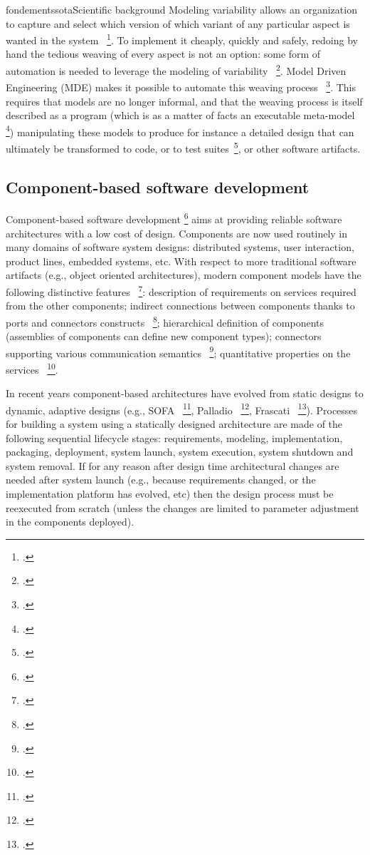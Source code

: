 \documentclass{ra2018}
\begin{document}
\begin{module}{fondements}{sota}{Scientific background}
Modeling variability allows an organization to capture and select which
version of which variant of any particular aspect is wanted in the
system~  \footcite{Bosch2002}. To implement it cheaply, quickly and safely, redoing by hand
the tedious weaving of every aspect is not an option: some form of automation
is needed to leverage the modeling of
variability~  \footcite{batory2002,czarnecki2000}. Model Driven Engineering (MDE)
makes it possible to automate this weaving process~  \footcite{Jezequel08a}. This
requires that models are no longer informal, and that the weaving process is
itself described as a program (which is as a matter of facts an executable
meta-model~  \footcite{Muller05a}) manipulating these models to produce for instance a
detailed design that can ultimately be transformed to code, or to test
suites~\footcite{Pickin07a}, or other software artifacts.


\subsection{Component-based software development}

Component-based software development   \footcite{szyperski2002component} aims at providing reliable software architectures with a low cost of design.
Components are now used routinely in many domains of software system designs: 
distributed systems, user interaction, product lines, embedded systems, etc.
With respect to more traditional software artifacts (e.g., object oriented architectures),
modern component models have the following distinctive features~  \footcite{crnkovic2011classification}: 
description of requirements on services required from the other components;
indirect connections between components thanks to ports and connectors constructs~  \footcite{lau2005exogenous};
hierarchical definition of components (assemblies of components can define new component types);
connectors supporting various communication semantics~  \footcite{bures2006sofa};
quantitative properties on the services~  \footcite{beugnard2010contract}.

In recent years  component-based architectures have evolved from static designs to dynamic, adaptive designs (e.g., SOFA~  \footcite{bures2006sofa}, Palladio~  \footcite{Becker:2009cl}, Frascati~  \footcite{Melisson:2010it}).
Processes for building a system using a statically designed architecture are made of  the following sequential lifecycle stages: requirements, modeling, implementation, packaging, deployment, system launch, system execution, system shutdown and system removal.
If for any reason after design time architectural changes are needed after system launch (e.g., because requirements changed, or the implementation platform has evolved, etc) then the design process must be reexecuted from scratch 
(unless the changes are limited to parameter adjustment in the components deployed).


\end{module}
\end{document}
